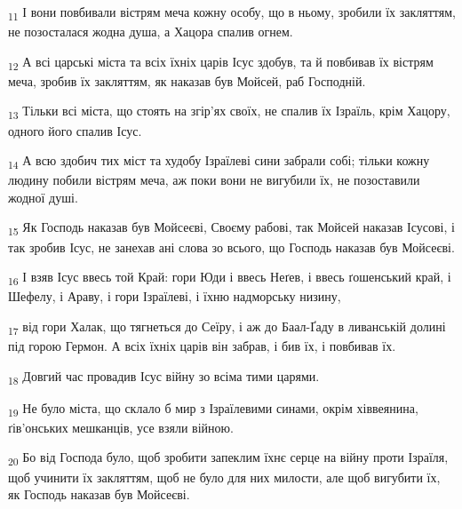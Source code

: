 \begin{tcolorbox}
\textsubscript{11} І вони повбивали вістрям меча кожну особу, що в ньому, зробили їх закляттям, не позосталася жодна душа, а Хацора спалив огнем.
\end{tcolorbox}
\begin{tcolorbox}
\textsubscript{12} А всі царські міста та всіх їхніх царів Ісус здобув, та й повбивав їх вістрям меча, зробив їх закляттям, як наказав був Мойсей, раб Господній.
\end{tcolorbox}
\begin{tcolorbox}
\textsubscript{13} Тільки всі міста, що стоять на згір'ях своїх, не спалив їх Ізраїль, крім Хацору, одного його спалив Ісус.
\end{tcolorbox}
\begin{tcolorbox}
\textsubscript{14} А всю здобич тих міст та худобу Ізраїлеві сини забрали собі; тільки кожну людину побили вістрям меча, аж поки вони не вигубили їх, не позоставили жодної душі.
\end{tcolorbox}
\begin{tcolorbox}
\textsubscript{15} Як Господь наказав був Мойсеєві, Своєму рабові, так Мойсей наказав Ісусові, і так зробив Ісус, не занехав ані слова зо всього, що Господь наказав був Мойсеєві.
\end{tcolorbox}
\begin{tcolorbox}
\textsubscript{16} І взяв Ісус ввесь той Край: гори Юди і ввесь Неґев, і ввесь ґошенський край, і Шефелу, і Араву, і гори Ізраїлеві, і їхню надморську низину,
\end{tcolorbox}
\begin{tcolorbox}
\textsubscript{17} від гори Халак, що тягнеться до Сеїру, і аж до Баал-Ґаду в ливанській долині під горою Гермон. А всіх їхніх царів він забрав, і бив їх, і повбивав їх.
\end{tcolorbox}
\begin{tcolorbox}
\textsubscript{18} Довгий час провадив Ісус війну зо всіма тими царями.
\end{tcolorbox}
\begin{tcolorbox}
\textsubscript{19} Не було міста, що склало б мир з Ізраїлевими синами, окрім хіввеянина, ґів'онських мешканців, усе взяли війною.
\end{tcolorbox}
\begin{tcolorbox}
\textsubscript{20} Бо від Господа було, щоб зробити запеклим їхнє серце на війну проти Ізраїля, щоб учинити їх закляттям, щоб не було для них милости, але щоб вигубити їх, як Господь наказав був Мойсеєві.
\end{tcolorbox}

